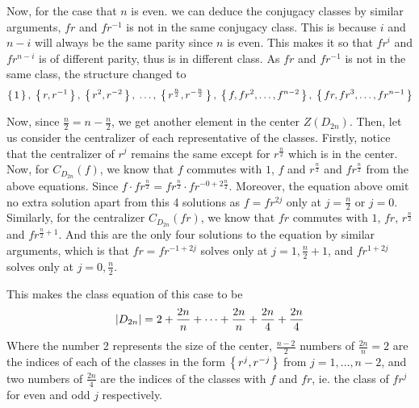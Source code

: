 \documentclass{report}
\begin{document}
{    Now, for the case that $n$ is even. we can deduce the conjugacy classes by similar arguments, $fr$ and $fr^{-1}$ is not 
    in the same conjugacy class. This is because $i$ and $n-i$ will always be the same parity since $n$ is even. This makes it 
    so that $fr^i$ and $fr^{n-i}$ is of different parity, thus is in different class. 
    As $fr$ and $fr^{-1}$ is not in the same class, the structure changed to
    \[ \left\{\, 1 \,\right\},\; \left\{\, r, r^{-1} \,\right\},\; \left\{\, r^2, r^{-2} \,\right\},\; \ldots,\; \left\{\, r^{\frac{n}{2}}, r^{-\frac{n}{2}} \,\right\},\; 
    \left\{\, f, fr^2, \ldots, f^{n-2} \,\right\},\; \left\{\, fr, fr^3, \ldots, fr^{n-1} \,\right\} \]

    Now, since $\frac{n}{2} = n - \frac{n}{2}$, we get another element in the center $Z(D_{2n})$. Then, let us consider the 
    centralizer of each representative of the classes. Firstly, notice that the centralizer of $r^j$ remains the same except
    for $r^{\frac{n}{2}}$ which is in the center. Now, for $C_{D_{2n}}(f)$, we know that $f$ commutes with $1$, $f$ and 
    $r^{\frac{n}{2}}$ and $fr^{\frac{n}{2}}$ from the above equations. 
    Since $f \cdot fr^{\frac{n}{2}} = fr^{\frac{n}{2}} \cdot fr^{-0 + 2\frac{n}{2}}$. Moreover, the equation above omit no 
    extra solution apart from this 4 solutions as $f = fr^{2j}$ only at $j = \frac{n}{2}$ or $j = 0$.
    Similarly, for the centralizer $C_{D_{2n}}(fr)$, we know that $fr$ commutes with $1$, $fr$, $r^{\frac{n}{2}}$ and 
    $fr^{\frac{n}{2}+1}$. And this are the only four solutions to the equation by similar arguments, which is that 
    $fr = fr^{-1 + 2j}$ solves only at $j = 1, \frac{n}{2}+1$, and $fr^{1 + 2j}$ solves only at $j = 0, \frac{n}{2}$. 

    This makes the class equation of this case to be 
    \[ \left\lvert D_{2n} \right\rvert = 2 + \frac{2n}{n} + \cdots + \frac{2n}{n} + \frac{2n}{4} + \frac{2n}{4} \]
    Where the number 2 represents the size of the center, $\frac{n-2}{2}$ numbers of $\frac{2n}{n} = 2$ are the indices of each 
    of the classes in the form $\left\{\, r^j, r^{-j} \,\right\}$ from $j = 1, \ldots, n-2$, and two numbers of $\frac{2n}{4}$ are the indices 
    of the classes with $f$ and $fr$, ie. the class of $fr^j$ for even and odd $j$ respectively.  
  }

  
\end{document}
